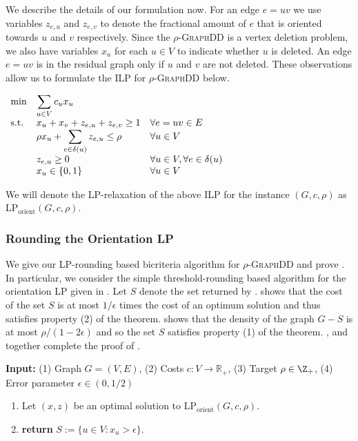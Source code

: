 \documentclass{article}
\newcommand{\densitydeletionset}{\textsc{GraphDD}\xspace}
\newcommand{\rhodensitydeletionset}{\ensuremath{\rho\text{-}}\densitydeletionset\xspace}
\begin{document}
We describe the details of our formulation now. For an edge $e=uv$ we use variables $z_{e,u}$
and $z_{e,v}$ to denote the fractional amount of $e$ that is oriented towards $u$ and $v$
respectively. Since the \rhodensitydeletionset is a vertex deletion problem, we also have variables
$x_u$ for each $u \in V$ to indicate whether $u$ is deleted. An edge $e=uv$ is in
the residual graph only if $u$ and $v$ are not deleted. These observations
allow us to formulate the ILP for \rhodensitydeletionset below.
\begin{center}
$\begin{array}{ll@{}ll}
        \text{min}  &\displaystyle\sum\limits_{u \in V} c_ux_{u}&   &\\
\text{s.t.}& x_u + x_v + z_{e, u} + z_{e, v} \geq 1 & & \forall e = uv \in E\\
        &\rho x_u + \displaystyle\sum\limits_{e\in \delta(u)}z_{e, u} \leq \rho &    & \forall u \in V \\
        &z_{e,u} \geq 0&&\forall u \in V, \forall e \in \delta(u)\\
        &x_u \in \{0, 1\}&&\forall u \in V
    \end{array}$ 
\end{center}
We will denote the LP-relaxation of the above ILP for the instance $(G, c, \rho)$ as $\text{LP}_{\text{orient}}(G, c, \rho)$.
\subsubsection{Rounding the Orientation LP}\label{sec:rounding-orientation-LP}

We give our LP-rounding based bicriteria algorithm for \rhodensitydeletionset and prove . In particular, we consider the simple threshold-rounding based algorithm for the orientation LP given in . Let $S$ denote the set returned by .  shows that the cost of the set $S$ is at most $1/\epsilon$ times the cost of an optimum solution and thus satisfies property (2) of the theorem.  shows that the density of the graph $G - S$ is at most $\rho/(1-2\epsilon)$ and so the set $S$ satisfies property (1) of the theorem. ,  and  together complete the proof of .

\begin{algorithm}
\caption{Bicriteria approximation algorithm for \densitydeletionset}\label{alg:bicriteria}
\textbf{Input:} (1) Graph $G=(V, E)$, (2) Costs $c:V\rightarrow\mathbb{R_{+}}$, (3) Target $\rho \in \Z_+$, (4) Error parameter $\epsilon \in (0, 1/2)$

\begin{enumerate}
    \item Let $(x, z)$ be an optimal solution to $\text{LP}_{\text{orient}}(G, c, \rho)$. 
    \item \textbf{return} $S := \{u \in V : x_u > \epsilon\}$.
\end{enumerate}
\end{algorithm}
\end{document}
